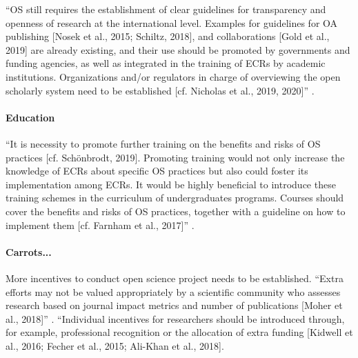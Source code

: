 %
``OS still requires the establishment of clear guidelines for transparency and
openness of research at the international level.
%
Examples for guidelines for OA publishing [Nosek et al., 2015; Schiltz, 2018],
and collaborations [Gold et al., 2019] are already existing, and their use
should be promoted by governments and funding agencies, as well as integrated in
the training of ECRs by academic institutions.
%
Organizations and/or regulators in charge of overviewing the open scholarly
system need to be established [cf. Nicholas et al., 2019, 2020]''
\citep{toribio2021early}.


\paragraph{Education}


%
``It is necessity to promote further training on the benefits and risks of OS
practices [cf. Schönbrodt, 2019].
%
Promoting training would not only increase the knowledge of ECRs about specific
OS practices but also could foster its implementation among ECRs.
%
It would be highly beneficial to introduce these training schemes in the
curriculum of undergraduates programs.
%
Courses should cover the benefits and risks of OS practices, together with a
guideline on how to implement them [cf. Farnham et al., 2017]''
\citep{toribio2021early}.


\paragraph{Carrots...}


%
More incentives to conduct open science project needs to be established.
%
``Extra efforts may not be valued appropriately by a scientific community who
assesses research based on journal impact metrics and number of publications
[Moher et al., 2018]'' \citep{toribio2021early}.
%
``Individual incentives for researchers should be introduced through, for
example, professional recognition or the allocation of extra funding [Kidwell et
al., 2016; Fecher et al., 2015; Ali-Khan et al., 2018].


